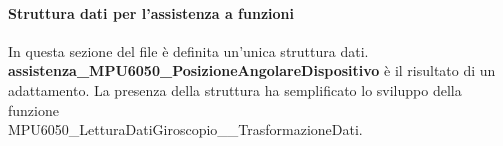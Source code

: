 \paragraph{Struttura dati per l'assistenza a funzioni}
In questa sezione del file è definita un'unica struttura dati.\\
\textbf{assistenza\_MPU6050\_PosizioneAngolareDispositivo} è il risultato di un adattamento. La presenza della struttura ha semplificato lo sviluppo della funzione\\
MPU6050\_LetturaDatiGiroscopio\_\_TrasformazioneDati.


